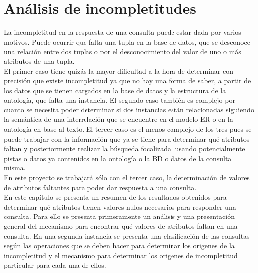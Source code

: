 \chapter{Análisis de incompletitudes} \label{chap:analisisOrigenIncompletitud}

\newcommand{\RESULT}[3]{
	\text{#1} \\[5pt]
}
\newcommand{\QUERY}[1]{
	\begin{center}
	\emph{#1}
	\end{center}
}

La incompletitud en la respuesta de una consulta puede estar dada por varios motivos. Puede ocurrir que falta una tupla en la base de datos, que se desconoce una relación entre dos tuplas o por el desconocimiento del valor de uno o más atributos de una tupla. \\

El primer caso tiene quizás la mayor dificultad a la hora de determinar con precisión que existe incompletitud ya que no hay una forma de saber, a partir de los datos que se tienen cargados en la base de datos y la estructura de la ontología, que falta una instancia. El segundo caso también es complejo por cuanto se necesita poder determinar si dos instancias están relacionadas siguiendo la semántica de una interrelación que se encuentre en el modelo ER o en la ontología en base al texto. El tercer caso es el menos complejo de los tres pues se puede trabajar con la información que ya se tiene para determinar qué atributos faltan y posteriormente realizar la búsqueda focalizada, usando potencialmente pistas o datos ya contenidos en la ontología o la BD o datos de la consulta misma.\\

En este proyecto se trabajará sólo con el tercer caso, la determinación de valores de atributos faltantes para poder dar respuesta a una consulta.\\

En este capítulo se presenta un resumen de los resultados obtenidos para determinar qué atributos tienen valores nulos necesarios para responder una consulta. Para ello se presenta primeramente un análisis y una presentación general del mecanismo para encontrar qué valores de atributos faltan en una consulta. En una segunda instancia se presenta una clasificación de las consultas según las operaciones que se deben hacer para determinar los origenes de la incompletitud y el mecanismo para determinar los origenes de incompletitud particular para cada una de ellos.\\

